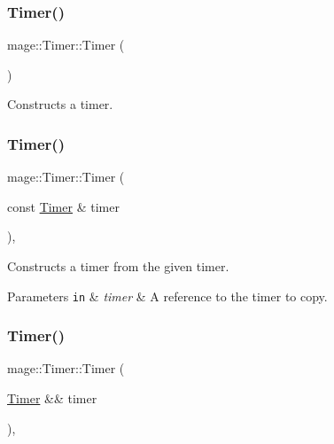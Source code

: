 \subsubsection{\texorpdfstring{Timer()}{Timer()}\hspace{0.1cm}{\footnotesize\ttfamily [1/3]}}
{\footnotesize\ttfamily mage\+::\+Timer\+::\+Timer (\begin{DoxyParamCaption}{ }\end{DoxyParamCaption})}

Constructs a timer. \hypertarget{classmage_1_1_timer_ae792c5a546deb35e5e65ed7fe6a8d281}{}\label{classmage_1_1_timer_ae792c5a546deb35e5e65ed7fe6a8d281} 
\subsubsection{\texorpdfstring{Timer()}{Timer()}\hspace{0.1cm}{\footnotesize\ttfamily [2/3]}}
{\footnotesize\ttfamily mage\+::\+Timer\+::\+Timer (\begin{DoxyParamCaption}\item[{const \hyperlink{classmage_1_1_timer}{Timer} \&}]{timer }\end{DoxyParamCaption})\hspace{0.3cm}{\ttfamily [default]}, {\ttfamily [noexcept]}}

Constructs a timer from the given timer.


\begin{DoxyParams}[1]{Parameters}
\mbox{\tt in}  & {\em timer} & A reference to the timer to copy. \\
\hline
\end{DoxyParams}
\hypertarget{classmage_1_1_timer_a9fde919b6040a044748e98f59e18bece}{}\label{classmage_1_1_timer_a9fde919b6040a044748e98f59e18bece} 
\subsubsection{\texorpdfstring{Timer()}{Timer()}\hspace{0.1cm}{\footnotesize\ttfamily [3/3]}}
{\footnotesize\ttfamily mage\+::\+Timer\+::\+Timer (\begin{DoxyParamCaption}\item[{\hyperlink{classmage_1_1_timer}{Timer} \&\&}]{timer }\end{DoxyParamCaption})\hspace{0.3cm}{\ttfamily [default]}, {\ttfamily [noexcept]}}

